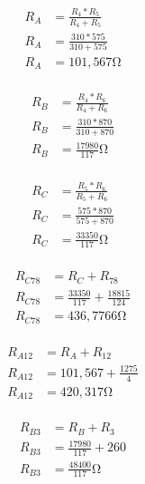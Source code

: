 \documentclass[12pt,a4paper]{article}
\begin{document}
\begin{minipage}{.33\linewidth}
\begin{align*}
        R_{A} &= \frac{R_4 * R_5}{R_4 + R_5} \\[0.5ex]
	R_{A} &= \frac{310 * 575}{310 + 575} \\[0.5ex]
	R_{A} &= 101,567 \si{\ohm} \\[0.5ex]
\end{align*}
\end{minipage}%
\begin{minipage}{.33\linewidth}
\begin{align*}
        R_{B} &= \frac{R_4 * R_6}{R_4 + R_6} \\[0.5ex]
	R_{B} &= \frac{310 * 870}{310 + 870} \\[0.5ex]
	R_{B} &= \frac{17980}{117} \si{\ohm} \\[0.5ex]
\end{align*}
\end{minipage}%
\begin{minipage}{.33\linewidth}
\begin{align*}
        R_{C} &= \frac{R_5 * R_6}{R_5 + R_6} \\[0.5ex]
	R_{C} &= \frac{575 * 870}{575 + 870} \\[0.5ex]
	R_{C} &= \frac{33350}{117} \si{\ohm} \\[0.5ex]
\end{align*}
\end{minipage}

\begin{minipage}{.33\linewidth}
\begin{align*}
        R_{C78} &= R_C + R_{78} \\[0.5ex]
	R_{C78} &= \frac{33350}{117} + \frac{18815}{124} \\[0.5ex]
	R_{C78} &= 436,7766 \si{\ohm} \\[0.5ex]
\end{align*}
\end{minipage}%
\begin{minipage}{.33\linewidth}
\begin{align*}
        R_{A12} &= R_A + R_{12} \\[0.5ex]
	R_{A12} &= 101,567 + \frac{1275}{4} \\[0.5ex]
	R_{A12} &= 420,317 \si{\ohm} \\[0.5ex]
\end{align*}
\end{minipage}%
\begin{minipage}{.33\linewidth}
\begin{align*}
        R_{B3} &= R_B + R_3 \\[0.5ex]
	R_{B3} &= \frac{17980}{117} + 260 \\[0.5ex]
	R_{B3} &= \frac{48400}{117} \si{\ohm} \\[0.5ex]
\end{align*}
\end{minipage}
\end{document}
